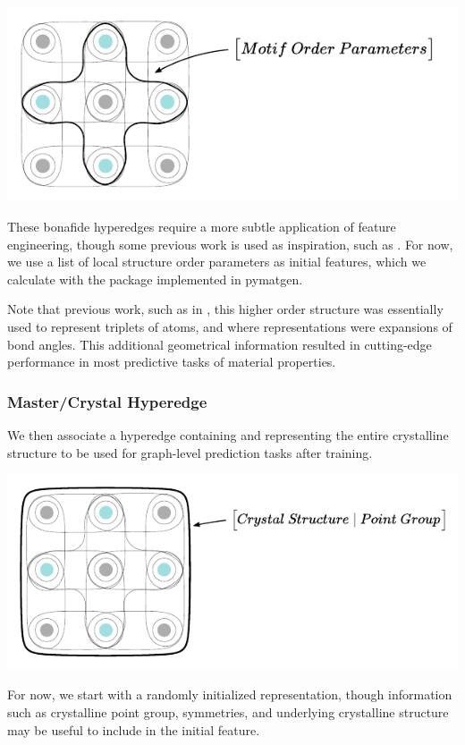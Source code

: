 \documentclass{article}
\begin{document}
\includegraphics[scale=0.74]{motif.pdf}

These bonafide hyperedges require a more subtle application of feature engineering, though some previous work is used as inspiration, such as \cite{zimmermann2020local}. For now, we use a list of local structure order parameters as initial features, which we calculate with the package implemented in pymatgen.


Note that previous work, such as in \cite{choudhary2021atomistic}
, this higher order structure was essentially used to represent triplets of atoms, and where representations were expansions of bond angles. This additional geometrical information resulted in cutting-edge performance in most predictive tasks of material properties.

  
\subsubsection{Master/Crystal Hyperedge}
We then associate a hyperedge containing and representing the entire crystalline structure to be used for graph-level prediction tasks after training. 

\includegraphics[scale=0.74]{master.pdf}

For now, we start with a randomly initialized representation, though information such as crystalline point group, symmetries, and underlying crystalline structure may be useful to include in the initial feature.
\end{document}

